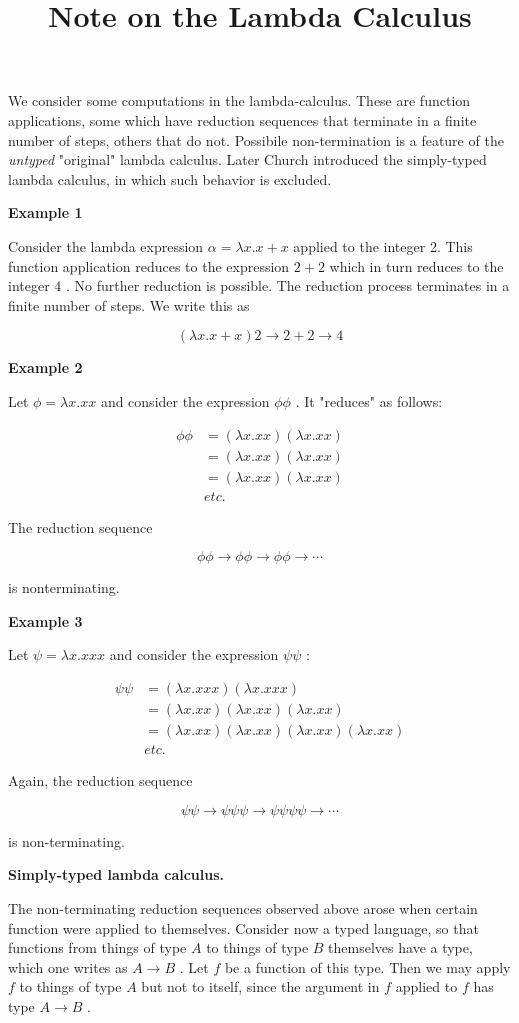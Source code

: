 \documentclass[11pt, oneside]{article}
\newcommand{\italic}[1]{{\sl #1}}
\newcommand{\subheading}[1]{{\bf #1}\par}
\begin{document}
 \title{Note  on  the  Lambda  Calculus}
 \maketitle
We  consider  some  computations  in  the  lambda-calculus.  These  are  function  applications,  some  which  have  reduction  sequences  that  terminate  in  a  finite  number  of  steps,  others  that  do  not.   Possibile  non-termination  is  a  feature  of  the   \italic{untyped} "original"  lambda  calculus.   Later  Church  introduced  the  simply-typed  lambda  calculus,  in  which  such  behavior  is  excluded.


 \subheading{Example  1}
Consider  the  lambda  expression   $\alpha = \lambda x. x + x$  applied  to  the  integer  2.  This  function  application  reduces  to  the  expression   $2 + 2$  which  in  turn  reduces  to  the  integer   $4$ .   No  further  reduction  is  possible.   The  reduction  process  terminates  in  a  finite  number  of  steps.  We  write  this  as


$$
 (\lambda x. x + x) 2 \to 2 + 2 \to 4
$$

 \subheading{Example  2}
Let    $\phi = \lambda x. xx$  and  consider  the  expression   $\phi \phi$ .  It  "reduces"  as  follows:


\begin{align}
\phi \phi & = (\lambda x. xx)(\lambda x. xx) \\
  & = (\lambda x. xx)(\lambda x. xx)  \\
& = (\lambda x. xx)(\lambda x. xx)  \\
& etc.
\end{align}

The   reduction  sequence


$$
\phi \phi \to \phi\phi \to \phi\phi \to \cdots
$$

is  nonterminating.


 \subheading{Example  3}
Let    $\psi = \lambda x. xxx$  and  consider  the  expression   $\psi \psi$ :


\begin{align}
\psi \psi & = (\lambda x. xxx)(\lambda x. xxx) \\
  & = (\lambda x. xx)(\lambda x. xx) (\lambda x. xx) \\
& = (\lambda x. xx)(\lambda x. xx)(\lambda x. xx)(\lambda x. xx)  \\
& etc.
\end{align}

Again,  the  reduction  sequence


$$
\psi\psi \to \psi\psi\psi \to \psi\psi\psi\psi \to \cdots
$$

is  non-terminating.


 \subheading{Simply-typed  lambda  calculus.}
The  non-terminating  reduction  sequences  observed  above  arose  when  certain  function  were  applied  to  themselves.   Consider  now  a  typed  language,  so  that  functions  from  things  of  type   $A$  to  things  of  type   $B$  themselves  have  a  type,  which  one  writes  as   $A \to B$ .   Let   $f$  be  a  function  of  this  type.   Then  we  may  apply   $f$  to  things  of  type   $A$  but  not  to  itself,  since  the  argument   in   $f$  applied  to   $f$  has  type   $A \to B$ .
\end{document}
